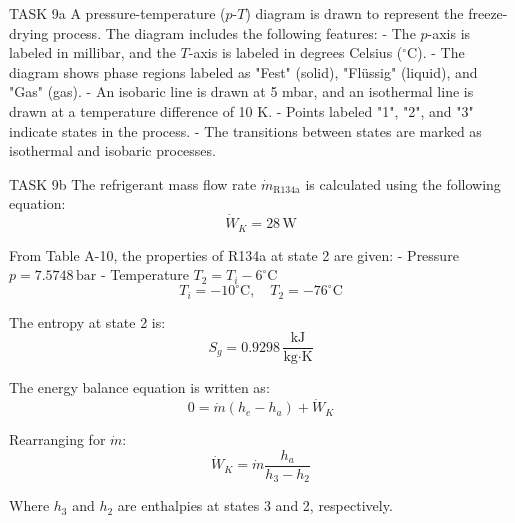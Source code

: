 TASK 9a  
A pressure-temperature (\( p \)-\( T \)) diagram is drawn to represent the freeze-drying process. The diagram includes the following features:  
- The \( p \)-axis is labeled in millibar, and the \( T \)-axis is labeled in degrees Celsius (\( ^\circ \text{C} \)).  
- The diagram shows phase regions labeled as "Fest" (solid), "Flüssig" (liquid), and "Gas" (gas).  
- An isobaric line is drawn at 5 mbar, and an isothermal line is drawn at a temperature difference of 10 K.  
- Points labeled "1", "2", and "3" indicate states in the process.  
- The transitions between states are marked as isothermal and isobaric processes.  

TASK 9b  
The refrigerant mass flow rate \( \dot{m}_{\text{R134a}} \) is calculated using the following equation:  
\[
\dot{W}_K = 28 \, \text{W}
\]  

From Table A-10, the properties of R134a at state 2 are given:  
- Pressure \( p = 7.5748 \, \text{bar} \)  
- Temperature \( T_2 = T_i - 6^\circ \text{C} \)  
\[
T_i = -10^\circ \text{C}, \quad T_2 = -76^\circ \text{C}
\]  

The entropy at state 2 is:  
\[
S_g = 0.9298 \, \frac{\text{kJ}}{\text{kg·K}}
\]  

The energy balance equation is written as:  
\[
0 = \dot{m} (h_e - h_a) + \dot{W}_K
\]  

Rearranging for \( \dot{m} \):  
\[
\dot{W}_K = \dot{m} \frac{h_a}{h_3 - h_2}
\]  

Where \( h_3 \) and \( h_2 \) are enthalpies at states 3 and 2, respectively.